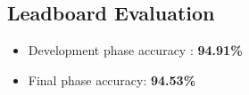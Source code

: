 \documentclass[conference,compsoc]{IEEEtran}
\begin{document}
\subsection{Leadboard Evaluation}
\begin{itemize}
\item Development phase accuracy : \textbf{94.91\%}
\item Final phase accuracy: \textbf{94.53\%}
\end{itemize}

\end{document}
